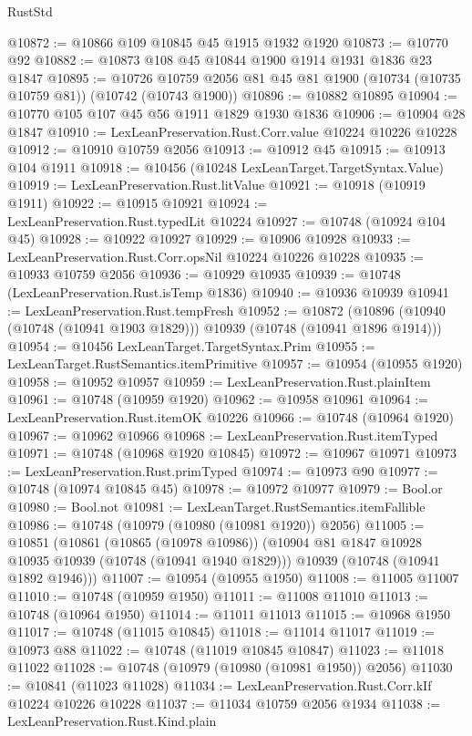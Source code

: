 \begin{lexlean}{RustStd}
\begin{coremodule}
@10872 := @10866 @109 @10845 @45 @1915 @1932 @1920
@10873 := @10770 @92
@10882 := @10873 @108 @45 @10844 @1900 @1914 @1931 @1836 @23 @1847
@10895 := @10726 @10759 @2056 @81 @45 @81 @1900 (@10734 (@10735 @10759 @81)) (@10742 (@10743 @1900))
@10896 := @10882 @10895
@10904 := @10770 @105 @107 @45 @56 @1911 @1829 @1930 @1836
@10906 := @10904 @28 @1847
@10910 := LexLeanPreservation.Rust.Corr.value @10224 @10226 @10228
@10912 := @10910 @10759 @2056
@10913 := @10912 @45
@10915 := @10913 @104 @1911
@10918 := @10456 (@10248 LexLeanTarget.TargetSyntax.Value)
@10919 := LexLeanPreservation.Rust.litValue
@10921 := @10918 (@10919 @1911)
@10922 := @10915 @10921
@10924 := LexLeanPreservation.Rust.typedLit @10224
@10927 := @10748 (@10924 @104 @45)
@10928 := @10922 @10927
@10929 := @10906 @10928
@10933 := LexLeanPreservation.Rust.Corr.opsNil @10224 @10226 @10228
@10935 := @10933 @10759 @2056
@10936 := @10929 @10935
@10939 := @10748 (LexLeanPreservation.Rust.isTemp @1836)
@10940 := @10936 @10939
@10941 := LexLeanPreservation.Rust.tempFresh
@10952 := @10872
    (@10896 (@10940 (@10748 (@10941 @1903 @1829))) @10939 (@10748 (@10941 @1896 @1914)))
@10954 := @10456 LexLeanTarget.TargetSyntax.Prim
@10955 := LexLeanTarget.RustSemantics.itemPrimitive
@10957 := @10954 (@10955 @1920)
@10958 := @10952 @10957
@10959 := LexLeanPreservation.Rust.plainItem
@10961 := @10748 (@10959 @1920)
@10962 := @10958 @10961
@10964 := LexLeanPreservation.Rust.itemOK @10226
@10966 := @10748 (@10964 @1920)
@10967 := @10962 @10966
@10968 := LexLeanPreservation.Rust.itemTyped
@10971 := @10748 (@10968 @1920 @10845)
@10972 := @10967 @10971
@10973 := LexLeanPreservation.Rust.primTyped
@10974 := @10973 @90
@10977 := @10748 (@10974 @10845 @45)
@10978 := @10972 @10977
@10979 := Bool.or
@10980 := Bool.not
@10981 := LexLeanTarget.RustSemantics.itemFallible
@10986 := @10748 (@10979 (@10980 (@10981 @1920)) @2056)
@11005 := @10851
    (@10861
      (@10865 (@10978 @10986))
      (@10904 @81 @1847 @10928 @10935 @10939 (@10748 (@10941 @1940 @1829)))
      @10939
      (@10748 (@10941 @1892 @1946)))
@11007 := @10954 (@10955 @1950)
@11008 := @11005 @11007
@11010 := @10748 (@10959 @1950)
@11011 := @11008 @11010
@11013 := @10748 (@10964 @1950)
@11014 := @11011 @11013
@11015 := @10968 @1950
@11017 := @10748 (@11015 @10845)
@11018 := @11014 @11017
@11019 := @10973 @88
@11022 := @10748 (@11019 @10845 @10847)
@11023 := @11018 @11022
@11028 := @10748 (@10979 (@10980 (@10981 @1950)) @2056)
@11030 := @10841 (@11023 @11028)
@11034 := LexLeanPreservation.Rust.Corr.kIf @10224 @10226 @10228
@11037 := @11034 @10759 @2056 @1934
@11038 := LexLeanPreservation.Rust.Kind.plain

\end{coremodule}
\end{lexlean}
